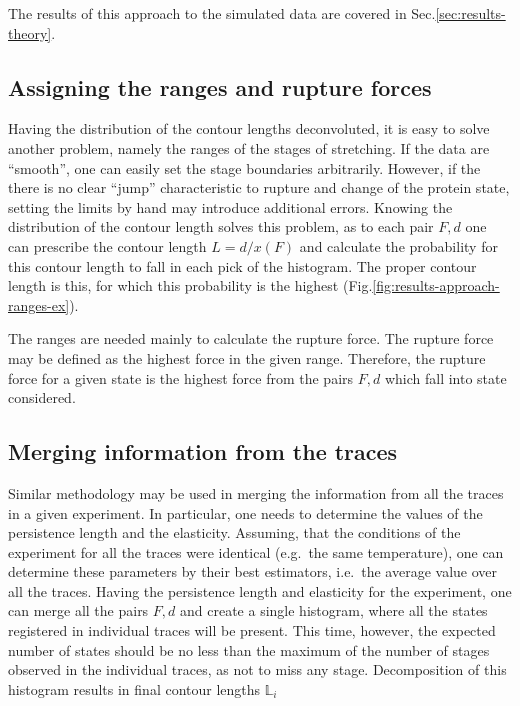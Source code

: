 The results of this approach to the simulated data are covered in Sec.\ref{sec:results-theory}.

\subsection{Assigning the ranges and rupture forces}
\label{subsec:results-approach-ranges}
\setcounter{fignums}{\value{figure}}
Having the distribution of the contour lengths deconvoluted, it is easy to solve another problem, namely the ranges of the stages of stretching.
If the data are ``smooth'', one can easily set the stage boundaries arbitrarily.
However, if the there is no clear ``jump'' characteristic to rupture and change of the protein state, setting the limits by hand may introduce additional errors.
Knowing the distribution of the contour length solves this problem, as to each pair $F,d$ one can prescribe the contour length $L=d/x(F)$ and calculate the probability for this contour length to fall in each pick of the histogram.
The proper contour length is this, for which this probability is the highest (Fig.\ref{fig:results-approach-ranges-ex}).

The ranges are needed mainly to calculate the rupture force.
The rupture force may be defined as the highest force in the given range.
Therefore, the rupture force for a given state is the highest force from the pairs $F,d$ which fall into state considered.


\subsection{Merging information from the traces}
\label{subsec:results-approach-merging}
Similar methodology may be used in merging the information from all the traces in a given experiment.
In particular, one needs to determine the values of the persistence length and the elasticity.
Assuming, that the conditions of the experiment for all the traces were identical (e.g.\ the same temperature), one can determine these parameters by their best estimators, i.e.\ the average value over all the traces.
Having the persistence length and elasticity for the experiment, one can merge all the pairs $F,d$ and create a single histogram, where all the states registered in individual traces will be present.
This time, however, the expected number of states should be no less than the maximum of the number of stages observed in the individual traces, as not to miss any stage.
Decomposition of this histogram results in final contour lengths $\mathbb{L}_i$

